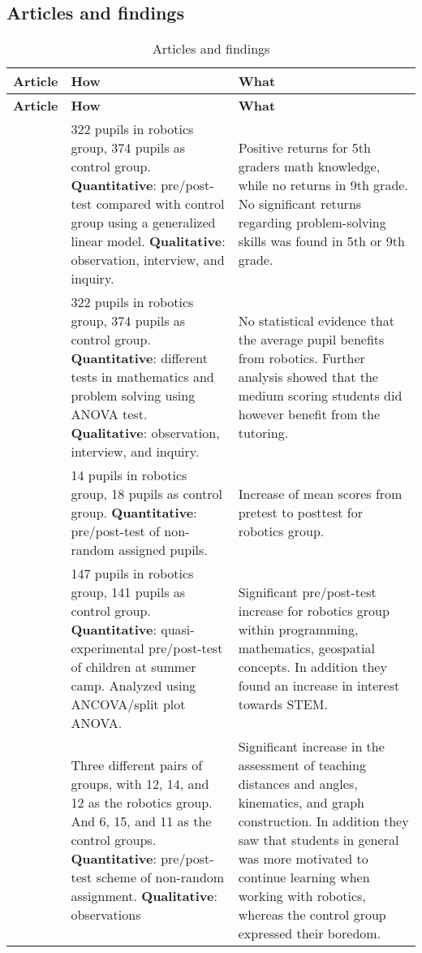 \subsection{Articles and findings}
\setlength\LTleft{0px}
\setlength\LTright{0px}
\begin{longtable}{@{\extracolsep{\fill}}p{}p{}@{\hspace{10pt}}p{}}
	\hline \multicolumn{1}{l}{\textbf{Article}} & \multicolumn{1}{l}{\textbf{How}} & \multicolumn{1}{l}{\textbf{What}} \\ \hline\hline
	\endfirsthead
	\hline \multicolumn{1}{l}{\textbf{Article}} & \multicolumn{1}{l}{\textbf{How}} & \multicolumn{1}{l}{\textbf{What}} \\ \hline\hline
	\endhead
	\hline \caption{Articles and findings}\endlastfoot
	\tcite{hussain2006effect} & 322 pupils in robotics group, 374 pupils as control group. \textbf{Quantitative}: pre/post-test compared with control group using a generalized linear model. \textbf{Qualitative}: observation, interview, and inquiry. & Positive returns for 5th graders math knowledge, while no returns in 9th grade. No significant returns regarding problem-solving skills was found in 5th or 9th grade. \\\hline
	
	\tcite{lindh2007does} & 322 pupils in robotics group, 374 pupils as control group. \textbf{Quantitative}: different tests in mathematics and problem solving using ANOVA test. \textbf{Qualitative}: observation, interview, and inquiry. &  No statistical evidence that the average pupil benefits from robotics. Further analysis showed that the medium scoring students did however benefit from the tutoring. \\\hline
	
	\tcite{barker2007robotics} & 14 pupils in robotics group, 18 pupils as control group. \textbf{Quantitative}: pre/post-test of non-random assigned pupils. & Increase of mean scores from pretest to posttest for robotics group. \\\hline
	\tcite{nugent2009use} & 147 pupils in robotics group, 141 pupils as control group. \textbf{Quantitative}: quasi-experimental pre/post-test of children at summer camp. Analyzed using ANCOVA/split plot ANOVA. & Significant pre/post-test increase for robotics group within programming, mathematics, geospatial concepts. In addition they found an increase in interest towards STEM.  \\\hline
	
	\tcite{mitnik2008autonomous} & Three different pairs of groups, with 12, 14, and 12 as the robotics group. And 6, 15, and 11 as the control groups. \textbf{Quantitative}: pre/post-test scheme of non-random assignment. \textbf{Qualitative}: observations  & Significant increase in the assessment of teaching distances and angles, kinematics, and graph construction. In addition they saw that students in general was more motivated to continue learning when working with robotics, whereas the control group expressed their boredom.  \\\hline
	

\end{longtable}
